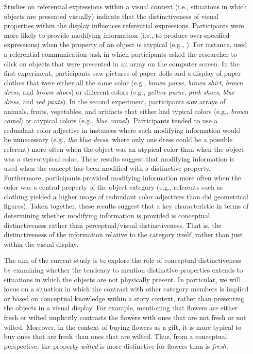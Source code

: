 \documentclass[output=paper]{langsci/langscibook}
\begin{document}
Studies on referential expressions within a visual context (i.e.,
situations in which objects are presented visually) indicate that the
distinctiveness of visual properties within the display influences
referential expressions. Participants\linebreak
were more likely to provide
modifying information (i.e., to produce over-spe\-ci\-fied expressions)
when the property of an object is atypical (e.g., \citealt{westerbeek2015stored}). For instance, \citet{rubio2016redundant} used a referential
communication task in which participants asked the researcher to click
on objects that were presented in an array on the computer screen. In
the first experiment, participants saw pictures of paper dolls and a
display of paper clothes that were either all the same color (e.g.,
\textit{brown purse}, \textit{brown shirt}, \textit{brown dress}, and \textit{brown shoes}) or different
colors (e.g., \textit{yellow purse}, \textit{pink shoes}, \textit{blue dress}, and \textit{red pants}). In
the second experiment, participants saw arrays of animals, fruits, vegetables,
and artifacts that either had typical colors (e.g., \textit{brown camel}) or
atypical colors (e.g., \textit{blue camel}).  Participants tended to use a
redundant color adjective in instances where such modifying
information would be unnecessary (e.g., \textit{the blue dress},
where only one dress could be a possible referent) more often when the
object was an atypical color than when the object was a stereotypical
color. These results suggest that modifying information is used when
the concept has been modified with a distinctive
property. Furthermore, participants provided modifying information
more often when the color was a central property of the object
category (e.g., referents such as clothing yielded a higher usage of
redundant color adjectives than did geometrical figures). Taken
together, these results suggest that a key characteristic in terms of
determining whether modifying information is provided is conceptual
distinctiveness rather than perceptual/visual distinctiveness.  That
is, the distinctiveness of the information relative to the category
itself, rather than just within the visual display.

The aim of the current study is to explore the role of conceptual
distinctiveness by examining whether the tendency to mention
distinctive properties extends to situations in which the objects are
not physically present. In particular, we will focus on a situation in
which the contrast with other category members is implied or based on
conceptual knowledge within a story context, rather than presenting
the objects in a visual display. For example, mentioning that flowers
are either fresh or wilted implicitly contrasts the flowers with ones
that are not fresh or not wilted. Moreover, in the context of buying
flowers as a gift, it is more typical to buy ones that are fresh than
ones that are wilted. Thus, from a conceptual perspective, the
property \textit{wilted} is more distinctive for flowers than is
\textit{fresh}.
\end{document}
